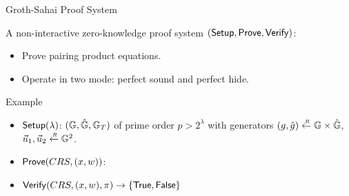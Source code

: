 \begin{frame}{Groth-Sahai Proof System}

  A non-interactive zero-knowledge proof system $({\mathsf{Setup}}, {\mathsf{Prove}}, {\mathsf{Verify}})$:
  \pause
  \begin{itemize}
  \item Prove pairing product equations.
  \item Operate in two mode: perfect sound and perfect hide.
  \end{itemize}
  
  \pause
  \begin{block}{Example}
    \begin{itemize}
    \item ${\mathsf{Setup}}(\lambda)$:  $(\mathbb{G}, \hat{\mathbb{G}}, \mathbb{G}_T)$ of prime order $p > 2^\lambda$ with generators $(g,\hat{g}) \stackrel{{\scriptscriptstyle \mkern4mu R}}{\gets} \mathbb{G} \times \hat{\mathbb{G}}$, $\vec{u}_1, \vec{u}_2 \stackrel{{\scriptscriptstyle \mkern4mu R}}{\gets} \mathbb{G}^2$.
    \item ${\mathsf{Prove}}(CRS, (x, w))$: 
    \item ${\mathsf{Verify}}(CRS, (x,w), \pi) \to \{\mathsf{True}, \mathsf{False}\}$
    \end{itemize}
  \end{block}
\end{frame}





